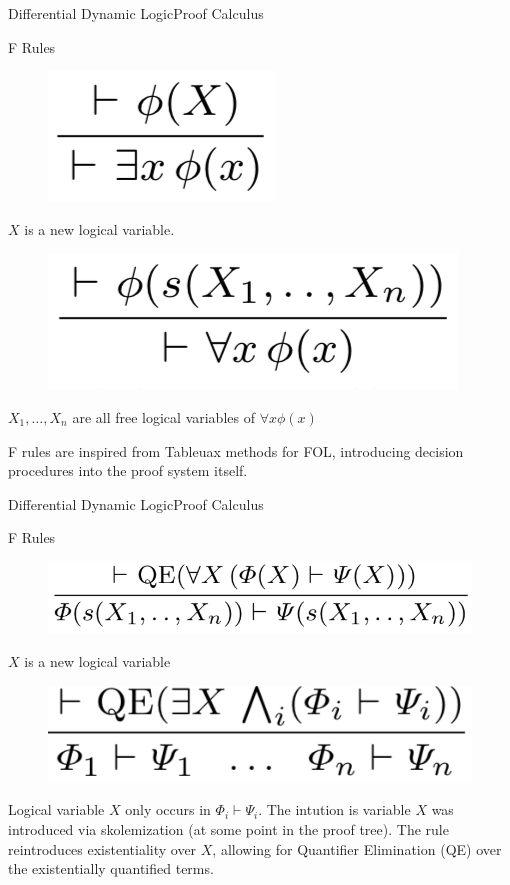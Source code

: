 \documentclass{beamer}
\begin{document}
\begin{frame}{Differential Dynamic Logic}{Proof Calculus}
  \begin{block}{F Rules}
  \begin{figure}
    \centering
    \includegraphics[scale=0.5]{F-existential-rule}
  \end{figure}
  $X$ is a new logical variable.
  \begin{figure}
    \centering
    \includegraphics[scale=0.5]{F-universal-rule}
  \end{figure}
  $X_1, \ldots, X_n$ are all free logical variables of $\forall x \phi(x)$
  \end{block}
  F rules are inspired from Tableuax methods for FOL, introducing decision
  procedures into the proof system itself.
\end{frame}


\begin{frame}{Differential Dynamic Logic}{Proof Calculus}
  \begin{block}{F Rules}
  \begin{figure}
    \centering
    \includegraphics[scale=0.5]{F-reintroduce-forall-rule}
  \end{figure}
    $X$ is a new logical variable
  \begin{figure}
    \centering
    \includegraphics[scale=0.5]{F-introduce-existential-rule}
  \end{figure}
  Logical variable $X$ only occurs in $\Phi_i \vdash \Psi_i$. The intution
  is variable $X$ was introduced via skolemization (at some point in the proof
  tree). The rule reintroduces existentiality over $X$, allowing for Quantifier
  Elimination (QE) over the existentially quantified terms.
  \end{block}
\end{frame}
\end{document}
